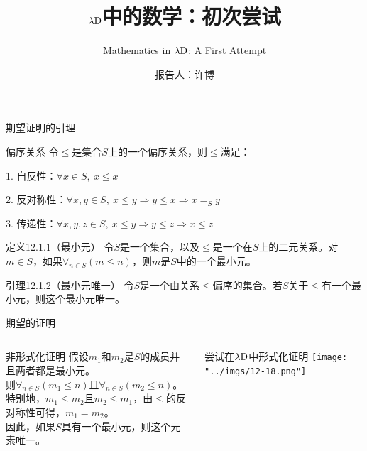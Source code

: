\documentclass[UTF8,aspectratio=169,mathserif]{beamer}
\title{$\lambda{\rm D}$中的数学：初次尝试}
\subtitle{Mathematics in $\lambda{\rm D}$: A First Attempt}
\author{报告人：许博}
\date{}
\begin{document}
	\begin{frame}
		\titlepage
	\end{frame}

	\begin{frame}[shrink]{期望证明的引理}
		\begin{block}{偏序关系}
			令$\le$是集合$S$上的一个偏序关系，则$\le$满足：
			
			1. 自反性：$\forall x\in S,\ x\le x$
			
			2. 反对称性：$\forall x,y\in S,\ x\le y\Rightarrow y\le x\Rightarrow x=_Sy$
			
			3. 传递性：$\forall x,y,z\in S,\ x\le y\Rightarrow y\le z\Rightarrow x\le z$
		\end{block}
	
		\begin{exampleblock}{定义12.1.1（最小元）}
			令$S$是一个集合，以及$\le$是一个在$S$上的二元关系。对$m\in S$，如果$\forall_{n\in S}(m\le n)$，则$m$是$S$中的一个最小元。
		\end{exampleblock}
		
		\begin{exampleblock}{引理12.1.2（最小元唯一）}
			令$S$是一个由关系$\le$偏序的集合。若$S$关于$\le$有一个最小元，则这个最小元唯一。
		\end{exampleblock}
	\end{frame}

	\begin{frame}{期望的证明}
		\begin{columns}
			\begin{column}{0.44\textwidth}
				\begin{block}{非形式化证明}
					假设$m_1$和$m_2$是$S$的成员并且两者都是最小元。\\
					则$\forall_{n\in S}(m_1\le n)$且$\forall_{n\in S}(m_2\le n)$。\\
					特别地，$m_1\le m_2$且$m_2\le m_1$，由$\le$的反对称性可得，$m_1=m_2$。\\
					因此，如果$S$具有一个最小元，则这个元素唯一。
				\end{block}
			\end{column}
			\begin{column}{0.56\textwidth}
				\begin{block}{尝试在$\lambda{\rm D}$中形式化证明}
					\texttt{[image: "../imgs/12-18.png"]}
				\end{block}
			\end{column}
		\end{columns}
	\end{frame}
\end{document}
